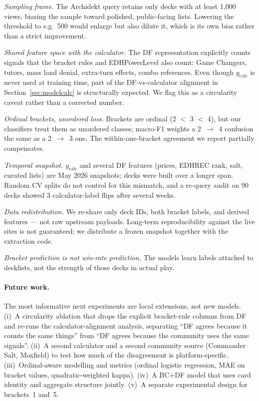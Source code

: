 \documentclass{article}
\begin{document}
\textit{Sampling frame.} The Archidekt query retains only decks with at least 1{,}000 views, biasing the sample toward polished, public-facing lists. Lowering the threshold to e.g.~500 would enlarge but also dilute it, which is its own bias rather than a strict improvement.

\textit{Shared feature space with the calculator.} The DF representation explicitly counts signals that the bracket rules and EDHPowerLevel also count: Game Changers, tutors, mass land denial, extra-turn effects, combo references. Even though \(y_{\text{calc}}\) is never used at training time, part of the DF-vs-calculator alignment in Section~\ref{sec:modelcalc} is structurally expected. We flag this as a circularity caveat rather than a corrected number.

\textit{Ordinal brackets, unordered loss.} Brackets are ordinal (2 \(<\) 3 \(<\) 4), but our classifiers treat them as unordered classes; macro-F1 weights a 2~\(\to\)~4 confusion the same as a 2~\(\to\)~3 one. The within-one-bracket agreement we report partially compensates.

\textit{Temporal snapshot.} \(y_{\text{calc}}\) and several DF features (prices, EDHREC rank, salt, curated lists) are May 2026 snapshots; decks were built over a longer span. Random CV splits do not control for this mismatch, and a re-query audit on 90 decks showed 3 calculator-label flips after several weeks.

\textit{Data redistribution.} We re-share only deck IDs, both bracket labels, and derived features --- not raw upstream payloads. Long-term reproducibility against the live sites is not guaranteed; we distribute a frozen snapshot together with the extraction code.

\textit{Bracket prediction is not win-rate prediction.} The models learn labels attached to decklists, not the strength of those decks in actual play.

\paragraph{Future work.} The most informative next experiments are local extensions, not new models. (i)~A circularity ablation that drops the explicit bracket-rule columns from DF and re-runs the calculator-alignment analysis, separating ``DF agrees because it counts the same things'' from ``DF agrees because the community uses the same signals''. (ii)~A second calculator and a second community source (Commander Salt, Moxfield) to test how much of the disagreement is platform-specific. (iii)~Ordinal-aware modelling and metrics (ordinal logistic regression, MAE on bracket values, quadratic-weighted kappa). (iv)~A BC+DF model that uses card identity and aggregate structure jointly. (v)~A separate experimental design for brackets~1 and~5.
\end{document}
